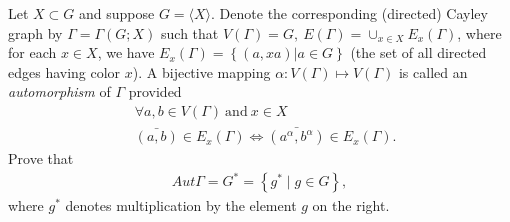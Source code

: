 \documentclass{article}
\begin{document}
\pagebreak


\begin{homeworkProblem}
    Let $X \subset G$ and suppose $G = \langle X \rangle$. 
    Denote the corresponding (directed) Cayley graph by $\Gamma = \Gamma(G; X)$
    such that $V(\Gamma) = G,\ E(\Gamma) = \cup_{x \in X} E_x (\Gamma)$,
    where for each $x \in X$, we have 
    $E_x(\Gamma) = \left\{ (a, xa) | a \in G \right\}$
    (the set of all directed edges having color $x$).
    A bijective mapping $\alpha: V(\Gamma) \mapsto V(\Gamma)$ 
    is called an \textit{automorphism} of $\Gamma$ provided
    \begin{align}
        &\forall a, b \in V(\Gamma) \ \text{and} \ x \in X\\
        &\bar{(a,b)} \in E_x (\Gamma) \Leftrightarrow \bar{(a^{\alpha}, b^{\alpha})} \in E_x(\Gamma).
    \end{align}
    Prove that 
    \begin{align}
        Aut \Gamma = G^* = \left\{ g^* \mid g \in G \right\},
    \end{align}
    where $g^*$ denotes multiplication by the element $g$ on the right.

    \solution


\end{homeworkProblem}
\end{document}
